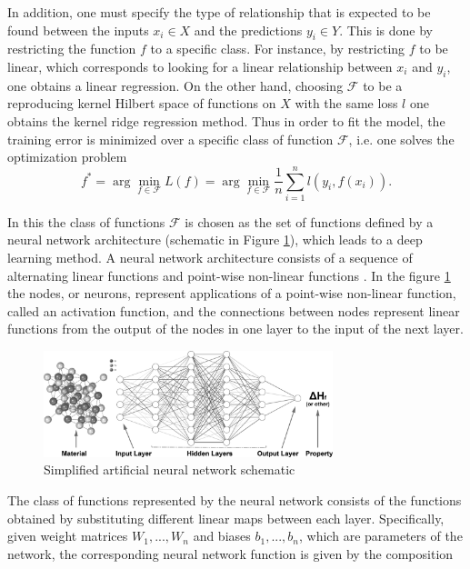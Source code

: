 In addition, one must specify the type of relationship that is expected to be found between the inputs $x_i\in X$ and the predictions $y_i\in Y$. This is done by restricting the function $f$ to a specific class. For instance, by restricting $f$ to be linear, which corresponds to looking for a linear relationship between $x_i$ and $y_i$, one obtains a linear regression. On the other hand, choosing $\mathcal{F}$ to be a reproducing kernel Hilbert space of functions on $X$ with the same loss $l$ one obtains the kernel ridge regression method. Thus in order to fit the model, the training error is minimized over a specific class of function $\mathcal{F}$, i.e. one solves the optimization problem
\begin{equation}\label{sipfenn:empirical_risk_min_eq}
    f^* = \arg\min_{f\in \mathcal{F}} L(f) = \arg\min_{f\in \mathcal{F}} \frac{1}{n}\displaystyle\sum_{i=1}^n l(y_i, f(x_i)).
\end{equation}

In this the class of functions $\mathcal{F}$ is chosen as the set of functions defined by a neural network architecture (schematic in Figure \ref{sipfenn:fig:nnschematic}), which leads to a deep learning method. A neural network architecture consists of a sequence of alternating linear functions and point-wise non-linear functions \cite{goodfellow2016deep}. In the figure \ref{sipfenn:fig:nnschematic} the nodes, or neurons, represent applications of a point-wise non-linear function, called an activation function, and the connections between nodes represent linear functions from the output of the nodes in one layer to the input of the next layer.

\begin{figure}[H]
    \centering
    \includegraphics[width=0.75\textwidth]{sipfenn/NN_schematic.png}
    \caption{Simplified artificial neural network schematic}
    \label{sipfenn:fig:nnschematic}
\end{figure}

The class of functions represented by the neural network consists of the functions obtained by substituting different linear maps between each layer. Specifically, given weight matrices $W_1,...,W_n$ and biases $b_1,...,b_n$, which are parameters of the network, the corresponding neural network function is given by the composition

